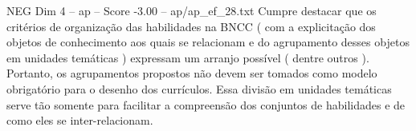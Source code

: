 \begin{textsample}{NEG Dim 4 – ap – Score -3.00 – ap/ap\_ef\_28.txt}
Cumpre destacar que os critérios de organização das habilidades na BNCC ( com a explicitação dos objetos de conhecimento aos quais se relacionam e do agrupamento desses objetos em unidades temáticas ) expressam um arranjo possível ( dentre outros ).
Portanto, os agrupamentos propostos não devem ser tomados como modelo obrigatório para o desenho dos currículos.
Essa divisão em unidades temáticas serve tão somente para facilitar a compreensão dos conjuntos de habilidades e de como eles se inter-relacionam.

\end{textsample}
